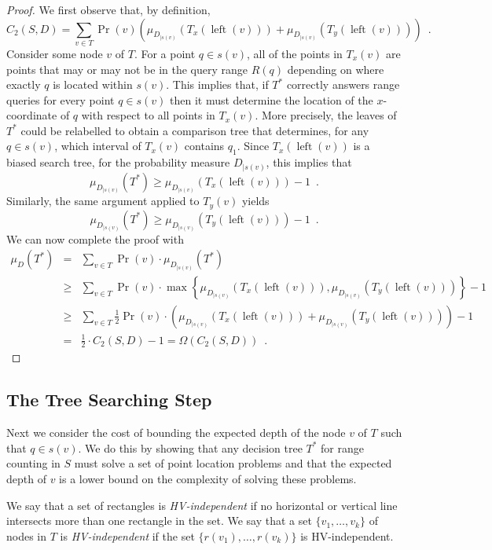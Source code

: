 \documentclass[lotsofwhite,charterfonts]{patmorin}
\DeclareMathOperator{\lft}{left}
\begin{document}
\begin{proof}
We first observe that, by definition,
\[
  C_2(S,D) =  \sum_{v\in T} 
              \Pr(v)\left( \mu_{D_{\mid s(v)}}(T_x(\lft(v)))
                               +  \mu_{D_{\mid s(v)}}(T_y(\lft(v))) \right)
           \enspace .
\]
Consider some node $v$ of $T$.  For a point $q\in s(v)$, all of the
points in $T_x(v)$ are points that may or may not be in the query
range $R(q)$ depending on where exactly $q$ is located within $s(v)$.
This implies that, if $T^*$ correctly answers range queries for every
point $q\in s(v)$ then it must determine the location of the
$x$-coordinate of $q$ with respect to all points in $T_x(v)$.  More
precisely, the leaves of $T^*$ could be relabelled to obtain a
comparison tree that determines, for any $q\in s(v)$, which interval
of $T_x(v)$ contains $q_1$.  Since $T_x(\lft(v))$ is a biased search tree,
for the probability measure $D_{\mid s(v)}$, this implies that
\[
  \mu_{D_{\mid s(v)}}(T^*) \ge \mu_{D_{\mid s(v)}}(T_x(\lft(v))) - 1\enspace .
\]
Similarly, the same argument applied to $T_y(v)$ yields 
\[
  \mu_{D_{\mid s(v)}}(T^*) \ge \mu_{D_{\mid s(v)}}(T_y(\lft(v))) - 1\enspace .
\]
We can now complete the proof with
\begin{eqnarray*}
\mu_D(T^*) 
 & = & \sum_{v\in T} \Pr(v)\cdot\mu_{D_{\mid s(v)}}(T^*) \\
 & \ge & \sum_{v\in T}
	\Pr(v) \cdot\max\left\{\mu_{D_{\mid s(v)}}(T_x(\lft(v))), 
		       \mu_{D_{\mid s(v)}}(T_y(\lft(v)))\right\} - 1 \\
 & \ge & \sum_{v\in T}
	\frac{1}{2}\Pr(v)\cdot\left( \mu_{D_{\mid s(v)}}(T_x(\lft(v)))
                             +  \mu_{D_{\mid s(v)}}(T_y(\lft(v))) \right) - 1 \\
 & = & \frac{1}{2}\cdot C_2(S,D) - 1 = \Omega(C_2(S,D)) \enspace .
\end{eqnarray*}
\end{proof}

\subsection{The Tree Searching Step}

Next we consider the cost of bounding the expected depth of the node
$v$ of $T$ such that $q\in s(v)$.  We do this by showing that any
decision tree $T^*$ for range counting in $S$ must solve a set of
point location problems and that the expected depth of $v$ is a lower
bound on the complexity of solving these problems.

We say that a set of rectangles is \emph{HV-independent} if no
horizontal or vertical line intersects more than one rectangle in the
set.  We say that a set $\{v_1,\ldots,v_k\}$ of nodes in $T$ is
\emph{HV-independent} if the set $\{r(v_1),\ldots,r(v_k)\}$ is
HV-independent.
\end{document}
